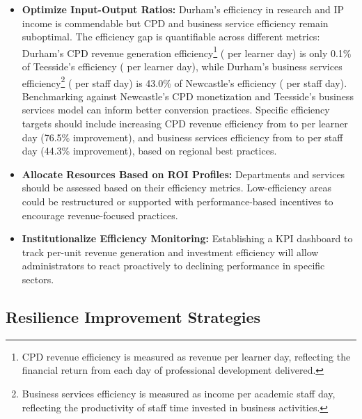 \documentclass[journal,onecolumn, 10pt,draftclsnofoot]{IEEEtran}
\begin{document}
\begin{itemize}
    \item \textbf{Optimize Input-Output Ratios:} Durham's efficiency in research and IP income is commendable but CPD and business service efficiency remain suboptimal. The efficiency gap is quantifiable across different metrics: Durham's CPD revenue generation efficiency\footnote{CPD revenue efficiency is measured as revenue per learner day, reflecting the financial return from each day of professional development delivered.} ( per learner day) is only 0.1\% of Teesside's efficiency ( per learner day), while Durham's business services efficiency\footnote{Business services efficiency is measured as income per academic staff day, reflecting the productivity of staff time invested in business activities.} ( per staff day) is 43.0\% of Newcastle's efficiency ( per staff day). Benchmarking against Newcastle's CPD monetization and Teesside's business services model can inform better conversion practices. Specific efficiency targets should include increasing CPD revenue efficiency from  to  per learner day (76.5\% improvement), and business services efficiency from  to  per staff day (44.3\% improvement), based on regional best practices.
    
    \item \textbf{Allocate Resources Based on ROI Profiles:} Departments and services should be assessed based on their efficiency metrics. Low-efficiency areas could be restructured or supported with performance-based incentives to encourage revenue-focused practices.
    
    \item \textbf{Institutionalize Efficiency Monitoring:} Establishing a KPI dashboard to track per-unit revenue generation and investment efficiency will allow administrators to react proactively to declining performance in specific sectors.
\end{itemize}

\subsection{Resilience Improvement Strategies}
\end{document}
